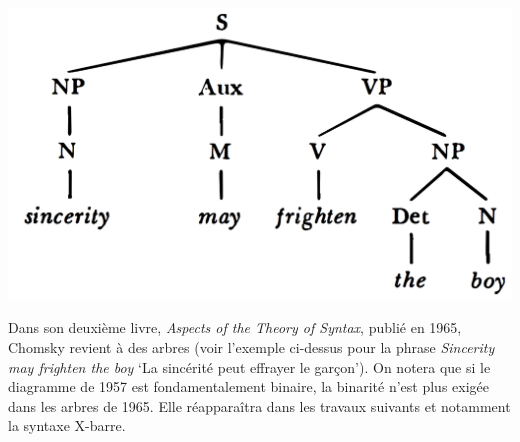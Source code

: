 {    \z

    \ea
    \citealt{Chomsky1965}
    \includegraphics[width=\textwidth]{figures/vol1syntaxe2-img027.png}
    \z

    Dans son deuxième livre, \textit{Aspects of the Theory of Syntax}, publié en 1965, Chomsky revient à des arbres (voir l’exemple ci-dessus pour la phrase \textit{Sincerity may frighten the boy} ‘La sincérité peut effrayer le garçon’). On notera que si le diagramme de 1957 est fondamentalement binaire, la binarité n’est plus exigée dans les arbres de 1965. Elle réapparaîtra dans les travaux suivants et notamment la syntaxe X-barre.
}
